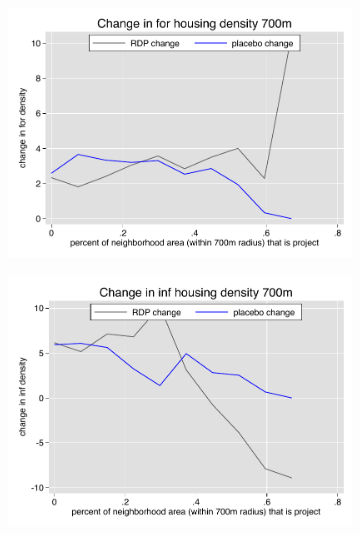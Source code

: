 \documentclass[12pt]{article}
\begin{document}
\begin{figure}
        \begin{subfigure}[b]{0.495\textwidth}
            \centering
            \includegraphics[width=\textwidth,trim={0.3cm .3cm 0.1cm 0cm}, clip=true]{figures/change_for_700_local.pdf}
        \end{subfigure}
        \hfill
        \begin{subfigure}[b]{0.495\textwidth}  
            \centering 
            \includegraphics[width=\textwidth,trim={0.3cm .3cm 0.1cm 0cm}, clip=true]{figures/change_inf_700_local.pdf}
        \end{subfigure}
        \vspace{-6mm}
  \end{figure} 
\end{document}
